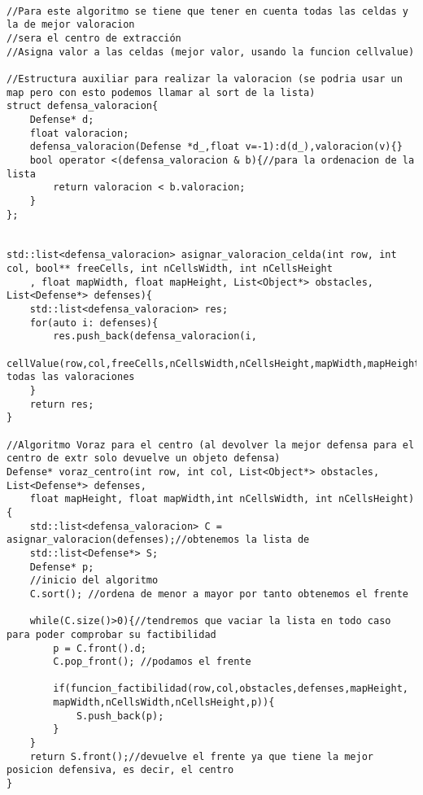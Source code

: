 \begin{lstlisting}

//Para este algoritmo se tiene que tener en cuenta todas las celdas y la de mejor valoracion 
//sera el centro de extracción  
//Asigna valor a las celdas (mejor valor, usando la funcion cellvalue)

//Estructura auxiliar para realizar la valoracion (se podria usar un map pero con esto podemos llamar al sort de la lista)
struct defensa_valoracion{
    Defense* d;
    float valoracion;
    defensa_valoracion(Defense *d_,float v=-1):d(d_),valoracion(v){}
    bool operator <(defensa_valoracion & b){//para la ordenacion de la lista
        return valoracion < b.valoracion;
    }
};


std::list<defensa_valoracion> asignar_valoracion_celda(int row, int col, bool** freeCells, int nCellsWidth, int nCellsHeight
	, float mapWidth, float mapHeight, List<Object*> obstacles, List<Defense*> defenses){
    std::list<defensa_valoracion> res;
    for(auto i: defenses){
        res.push_back(defensa_valoracion(i,
        cellValue(row,col,freeCells,nCellsWidth,nCellsHeight,mapWidth,mapHeight,obstacles,defenses)));//insertamos todas las valoraciones
    }
    return res;
}

//Algoritmo Voraz para el centro (al devolver la mejor defensa para el centro de extr solo devuelve un objeto defensa)
Defense* voraz_centro(int row, int col, List<Object*> obstacles, List<Defense*> defenses,
    float mapHeight, float mapWidth,int nCellsWidth, int nCellsHeight){
    std::list<defensa_valoracion> C = asignar_valoracion(defenses);//obtenemos la lista de 
    std::list<Defense*> S; 
    Defense* p;
    //inicio del algoritmo
    C.sort(); //ordena de menor a mayor por tanto obtenemos el frente
    
    while(C.size()>0){//tendremos que vaciar la lista en todo caso para poder comprobar su factibilidad
        p = C.front().d; 
        C.pop_front(); //podamos el frente

        if(funcion_factibilidad(row,col,obstacles,defenses,mapHeight,
        mapWidth,nCellsWidth,nCellsHeight,p)){
            S.push_back(p);
        }    
    }
    return S.front();//devuelve el frente ya que tiene la mejor posicion defensiva, es decir, el centro
}

\end{lstlisting}